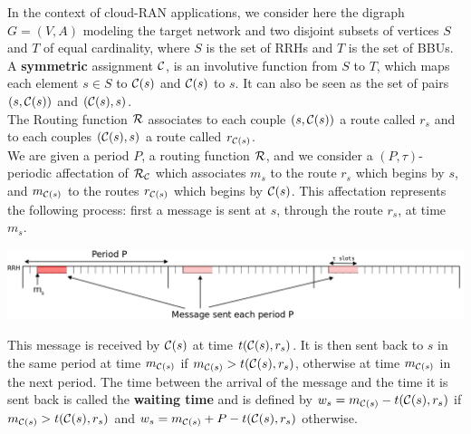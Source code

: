 \documentclass[a4paper,10pt]{article}
\begin{document}
      
      In the context of cloud-RAN applications, we consider here the digraph $G=(V,A)$ modeling the target network 
      and two disjoint subsets of vertices $S$ and $T$ of equal cardinality, where $S$ is the set of RRHs and $T$ is the set of BBUs. 
      A \textbf{symmetric} assignment ${\cal C}$, is an involutive function from $S$ to $T$, which maps each element $s\in S$ to ${\cal C}(s)$ and ${\cal C}(s)$ to $s$. It can also be seen as the set of pairs $(s,{\cal C}(s))$ and $({\cal C}(s),s)$.\\
      The Routing function ${\cal R}$ associates to each couple $(s,{\cal C}(s))$ a route called $r_s$ and to each couples $({\cal C}(s),s)$ a route called $r_{{\cal C}(s)}$.\\     
       We are given a period $P$, a routing function ${\cal R}$, and we consider a $(P,\tau)$-periodic affectation of ${\cal R}_{\cal C}$ which associates $m_s$ to the route $r_s$ which begins by $s$, and $m_{{\cal C}(s)}$ to the routes $r_{{\cal C}(s)}$ which begins by ${\cal C}(s)$.  This affectation represents the following process: first a message is sent at $s$, through the route $r_s$, at time $m_s$.
      
%       
      
      
      \begin{center}
      \includegraphics[scale=0.3]{rrh.png}
      \end{center}
      
      

      This message is received by ${\cal C}(s)$ at time $t({\cal C}(s),r_s)$. It is then sent back to $s$ in the same period at time $m_{{\cal C}(s)}$ if $m_{{\cal C}(s)} > t({\cal C}(s),r_s)$, otherwise at time $m_{{\cal C}(s)}$ in the next period. The time between the arrival of the message and the time it is sent back is called the \textbf{waiting time} and is defined by $w_s = m_{{\cal C}(s)} - t({\cal C}(s),r_s)$ if $m_{{\cal C}(s)} > t({\cal C}(s),r_s)$ and $w_s = m_{{\cal C}(s)} + P - t({\cal C}(s),r_s)$ otherwise.
      
\end{document}
